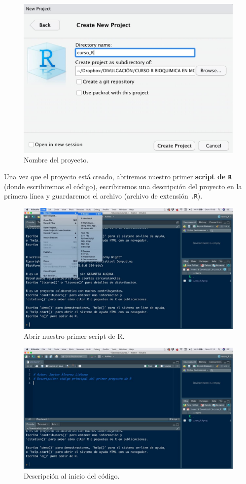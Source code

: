 \documentclass[11pt,]{book}
\begin{document}
\begin{figure}

{\centering \includegraphics[width=0.5\linewidth]{./img/crear_proyecto4} 

}

\caption{Nombre del proyecto.}\label{fig:crear-proyecto4}
\end{figure}

Una vez que el proyecto está creado, abriremos nuestro primer \textbf{script de \texttt{R}} (donde escribiremos el código), escribiremos una descripción del proyecto en la primera línea y guardaremos el archivo (archivo de extensión \texttt{.R}).

\begin{figure}

{\centering \includegraphics[width=0.5\linewidth]{./img/crear_proyecto5} 

}

\caption{Abrir nuestro primer script de R.}\label{fig:crear-proyecto5}
\end{figure}

\begin{figure}

{\centering \includegraphics[width=0.5\linewidth]{./img/crear_proyecto6} 

}

\caption{Descripción al inicio del código.}\label{fig:crear-proyecto6}
\end{figure}
\end{document}
